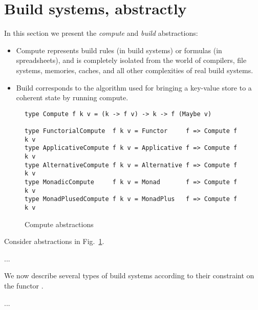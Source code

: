 \clearpage

\section{Build systems, abstractly}\label{sec-build-abstractions}

In this section we present the \emph{compute} and \emph{build} abstractions:
\begin{itemize}
    \item Compute represents build rules (in build systems) or formulas (in
    spreadsheets), and is completely isolated from the world of compilers, file
    systems, memories, caches, and all other complexities of real build systems.
    \item Build corresponds to the algorithm used for bringing a key-value store
    to a coherent state by running compute.
\end{itemize}

\begin{figure}
\begin{verbatim}
type Compute f k v = (k -> f v) -> k -> f (Maybe v)

type FunctorialCompute  f k v = Functor     f => Compute f k v
type ApplicativeCompute f k v = Applicative f => Compute f k v
type AlternativeCompute f k v = Alternative f => Compute f k v
type MonadicCompute     f k v = Monad       f => Compute f k v
type MonadPlusedCompute f k v = MonadPlus   f => Compute f k v
\end{verbatim}
\caption{Compute abstractions}\label{fig-compute}
\end{figure}

Consider abstractions in Fig.~\ref{fig-compute}.

...

We now describe several types of build systems according to their constraint
on the functor .

...

